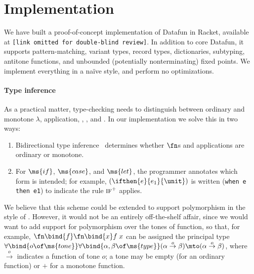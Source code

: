 \section{Implementation}
We have built a proof-of-concept implementation of Datafun in Racket, available
at \texttt{[link omitted for double-blind review]}. In addition to core Datafun,
it supports pattern-matching, variant types, record types, dictionaries,
subtyping, antitone functions, and unbounded (potentially nonterminating) fixed
points. We implement everything in a na\"ive style, and perform no
optimizations.

\paragraph{Type inference}
As a practical matter, type-checking needs to distinguish between ordinary and
monotone $\lambda$, application, , , and . In our
implementation we solve this in two ways:
\begin{enumerate}
\item Bidirectional type inference~\cite{bidirectional} determines whether
  $\fn$s and applications are ordinary or monotone.

\item For $\ms{if}$, $\ms{case}$, and $\ms{let}$, the programmer annotates which
  form is intended; for example, $(\ifthen{e}{e_1}{\unit})$ is written
  (\texttt{when e then e1}) to indicate the rule $\textsc{if}^+$ applies.
\end{enumerate}

We believe that this scheme could be extended to support polymorphism
in the style of \citet{dunfield-bidir}. However, it would not be an
entirely off-the-shelf affair, since we would want to add support for
polymorphism over the tones of function, so that, for example,
$\fn\bind{f}\fn\bind{x} f\;x$ can be assigned the principal type
$\forall\bind{o\of\ms{tone}}\forall\bind{\alpha,\beta \of \ms{type}}
(\alpha \overset{o}\to \beta) \mto (\alpha \overset{o}\to \beta)$,
where $\overset{o}\to$ indicates a function of tone $o$; a tone may be
empty (for an ordinary function) or ${+}$ for a monotone function.

% 
% 

